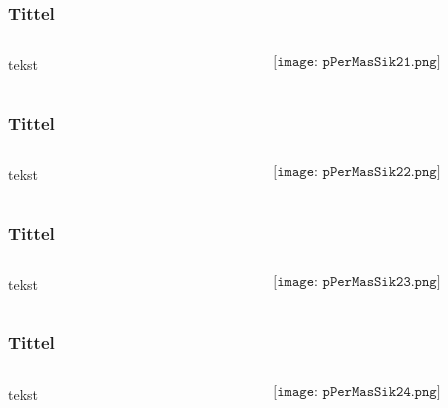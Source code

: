 \documentclass[aspectratio=169,xcolor=dvipsnames]{beamer}
\begin{document}
\begin{frame}
	\frametitle{Tittel}
	\begin{columns}
		\begin{column}{0.5\textwidth}
tekst
			
		\end{column}

		\begin{column}{0.5\textwidth}
	$$\texttt{[image: pPerMasSik21.png]}$$
		\end{column}
	\end{columns}
\end{frame}

\begin{frame}
	\frametitle{Tittel}
	\begin{columns}
		\begin{column}{0.5\textwidth}
tekst
			
		\end{column}

		\begin{column}{0.5\textwidth}
	$$\texttt{[image: pPerMasSik22.png]}$$
		\end{column}
	\end{columns}
\end{frame}

\begin{frame}
	\frametitle{Tittel}
	\begin{columns}
		\begin{column}{0.5\textwidth}
tekst
			
		\end{column}

		\begin{column}{0.5\textwidth}
	$$\texttt{[image: pPerMasSik23.png]}$$
		\end{column}
	\end{columns}
\end{frame}

\begin{frame}
	\frametitle{Tittel}
	\begin{columns}
		\begin{column}{0.5\textwidth}
tekst
			
		\end{column}

		\begin{column}{0.5\textwidth}
	$$\texttt{[image: pPerMasSik24.png]}$$
		\end{column}
	\end{columns}
\end{frame}
\end{document}
